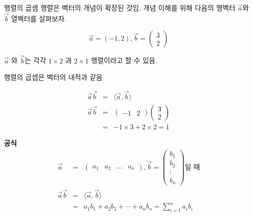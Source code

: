 \documentclass[10pt,t]{beamer}
\begin{document}
\begin{frame}{행렬의 곱셈}
    행렬은 벡터의 개념이 확장된 것임. 개념 이해를 위해 다음의 행벡터 $\vec{a}$와 $\vec{b}$ 열벡터를 살펴보자. 
    
    \[\vec{a} = (-1, 2), \vec{b} = \begin{pmatrix}
        3\\2
    \end{pmatrix}\]
    
    $\vec{a}$ 와 $\vec{b}$는 각각 $1\times2 $ 과 $2\times 1$ 행렬이라고 할 수 있음.

    행렬의 곱셉은 벡터의 내적과 같음

    \begin{eqnarray*}
        \vec{a} \vec{b} &=& \langle \vec{a}, \vec{b} \rangle \\    
        \vec{a} \vec{b} &=& \begin{pmatrix}
            -1 & 2 
        \end{pmatrix} \begin{pmatrix}
            3\\
            2
        \end{pmatrix}\\
        &=& -1 \times 3 + 2 \times 2 = 1
    \end{eqnarray*}
    
    \textbf{공식}
 \begin{eqnarray*}
     \vec{a} &=& \begin{pmatrix}
         a_1 & a_2 & \ldots & a_n
     \end{pmatrix}, \vec{b} = \begin{pmatrix}
        b_1 \\
        b_2 \\
        \vdots \\
        b_n
    \end{pmatrix} \text{일 때} \\
    \vec{a} \vec{b} &=& \langle \vec{a}, \vec{b} \rangle \\    
    &=& a_1 b_1 + a_2 b_2 + \cdots + a_n b_n = \sum _{i=1} ^n a_i b_i
 \end{eqnarray*}


\end{frame}
\end{document}
